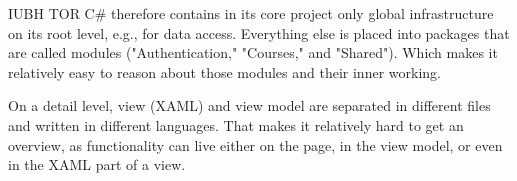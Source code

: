IUBH TOR C\# therefore contains in its core project only global infrastructure on its root level, e.g., for data access. Everything else is placed into packages that are called modules ("Authentication," "Courses," and "Shared"). Which makes it relatively easy to reason about those modules and their inner working.

On a detail level, view (XAML) and view model are separated in different files and written in different languages. That makes it relatively hard to get an overview, as functionality can live either on the page, in the view model, or even in the XAML part of a view.
